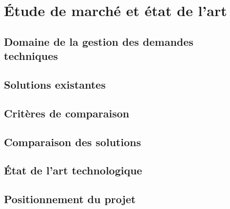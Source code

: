 \chapter{Étude de marché et état de l'art}
\label{chap:02-etat-art}
\clearpage

\section{Domaine de la gestion des demandes techniques}
\label{sec:02-etat-art-1}

\section{Solutions existantes}
\label{sec:02-etat-art-2}

\section{Critères de comparaison}
\label{sec:02-etat-art-3}

\section{Comparaison des solutions}
\label{sec:02-etat-art-4}

\section{État de l'art technologique}
\label{sec:02-etat-art-5}

\section{Positionnement du projet}
\label{sec:02-etat-art-6}
